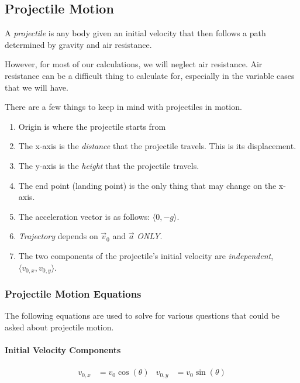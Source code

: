 \subsection{Projectile Motion}\label{subsec:Projectile Motion}
\begin{definition}[Projectile]\label{def:Projectile}
  A \emph{projectile} is any body given an initial velocity that then follows a path determined by gravity and air resistance.
  \begin{remark}
    However, for most of our calculations, we will neglect air resistance.
    Air resistance can be a difficult thing to calculate for, especially in the variable cases that we will have.
  \end{remark}
\end{definition}

There are a few things to keep in mind with projectiles in motion.
\begin{enumerate}
  \item Origin is where the projectile starts from
  \item The x-axis is the \emph{distance} that the projectile travels. This is its displacement.
  \item The y-axis is the \emph{height} that the projectile travels.
  \item The end point (landing point) is the only thing that may change on the x-axis.
  \item The acceleration vector is as follows: $\langle 0, -g \rangle$.
  \item \emph{Trajectory} depends on $\vec{v}_{0}$ and $\vec{a}$ \emph{ONLY}.
  \item The two components of the projectile's initial velocity are \emph{independent}, $\langle v_{0,x}, v_{0,y} \rangle$.
\end{enumerate}

\subsubsection{Projectile Motion Equations}\label{subsubsec:Projectile Motion Eqns}
The following equations are used to solve for various questions that could be asked about projectile motion.

\paragraph{Initial Velocity Components}\label{par:Projectile Initial Velocity Components}
\begin{equation}\label{eq:Projectile Initial Velocity Components}
  \begin{aligned}
    v_{0,x} &= v_{0} \cos ( \theta ) & v_{0,y} &= v_{0} \sin ( \theta ) \\
  \end{aligned}
\end{equation}

